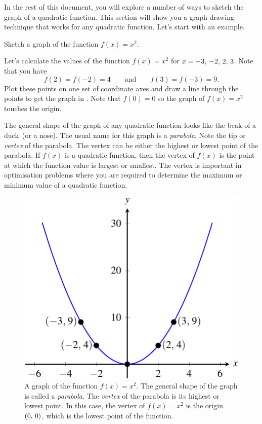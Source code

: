 \documentclass[a4paper,oneside,12pt]{article}
\begin{document}
In the rest of this document, you will explore a number of ways to
sketch the graph of a quadratic function.  This section will show you
a graph drawing technique that works for any quadratic function.
Let's start with an example.

\begin{example}
Sketch a graph of the function $f(x) = x^2$.
\end{example}

\begin{solution}
Let's calculate the values of the function $f(x) = x^2$ for
$x = {-3},\, {-2},\, {2},\, {3}$.  Note that you have
\[
f(2) = f(-2) = 4
\qquad
\text{and}
\qquad
f(3) = f(-3) = 9.
\]
Plot these points on one set of coordinate axes and draw a line
through the points to get the graph in .
Note that $f(0) = 0$ so the graph of $f(x) = x^2$ touches the origin.
\end{solution}

The general shape of the graph of any quadratic function looks like
the beak of a duck~(or a nose).  The usual name for this graph is a
\emph{parabola}.  Note the tip or \emph{vertex} of the parabola.  The
vertex can be either the highest or lowest point of the parabola.  If
$f(x)$ is a quadratic function, then the vertex of $f(x)$ is the point
at which the function value is largest or smallest.  The vertex is
important in optimisation problems where you are required to determine
the maximum or minimum value of a quadratic function.

\begin{figure}[!htbp]
\centering
\includegraphics[scale=1.2]{image/08/a-1.pdf}
\caption{%
  A graph of the function $f(x) = x^2$.  The general shape of the
  graph is called a \emph{parabola}.  The \emph{vertex} of the
  parabola is its highest or lowest point.  In this case, the vertex
  of $f(x) = x^2$ is the origin $\left\lparen{0},\, {0}\right\rparen$, which is the lowest
  point of the function.
}
\label{fig:quadratic_a_1}
\end{figure}
\end{document}
